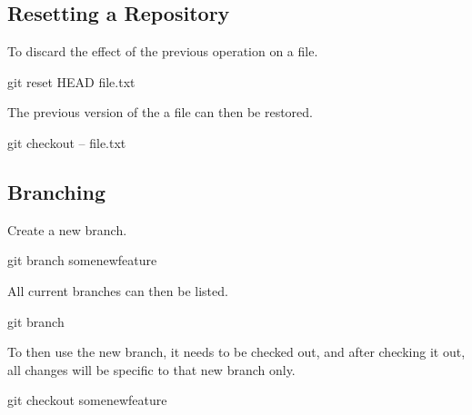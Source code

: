 \documentclass[]{book}
\newenvironment{Shaded}{\begin{snugshade}}{\end{snugshade}}
\newcommand{\FunctionTok}[1]{\textcolor[rgb]{0.00,0.00,0.00}{#1}}
\newcommand{\NormalTok}[1]{#1}
\begin{document}
\hypertarget{resetting-a-repository}{%
\subsection{Resetting a Repository}\label{resetting-a-repository}}

To discard the effect of the previous operation on a file.

\begin{Shaded}
\begin{Highlighting}[]
\FunctionTok{git}\NormalTok{ reset HEAD file.txt}
\end{Highlighting}
\end{Shaded}

The previous version of the a file can then be restored.

\begin{Shaded}
\begin{Highlighting}[]
\FunctionTok{git}\NormalTok{ checkout -- file.txt}
\end{Highlighting}
\end{Shaded}

\hypertarget{branching}{%
\subsection{Branching}\label{branching}}

Create a new branch.

\begin{Shaded}
\begin{Highlighting}[]
\FunctionTok{git}\NormalTok{ branch somenewfeature}
\end{Highlighting}
\end{Shaded}

All current branches can then be listed.

\begin{Shaded}
\begin{Highlighting}[]
\FunctionTok{git}\NormalTok{ branch}
\end{Highlighting}
\end{Shaded}

To then use the new branch, it needs to be checked out, and after checking it out, all changes will be specific to that new branch only.

\begin{Shaded}
\begin{Highlighting}[]
\FunctionTok{git}\NormalTok{ checkout somenewfeature}
\end{Highlighting}
\end{Shaded}
\end{document}
